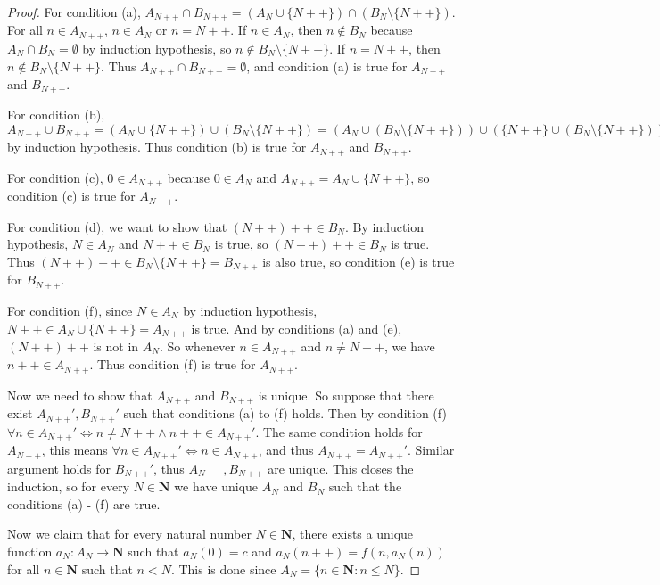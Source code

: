 \begin{proof}
    For condition (a), \(A_{N++} \cap B_{N++} = (A_N \cup \{N++\}) \cap (B_N \setminus \{N++\})\).
    For all \(n \in A_{N++}\), \(n \in A_N\) or \(n = N++\).
    If \(n \in A_N\), then \(n \notin B_N\) because \(A_N \cap B_N = \emptyset\) by induction hypothesis, so \(n \notin B_N \setminus \{N++\}\).
    If \(n = N++\), then \(n \notin B_N \setminus \{N++\}\).
    Thus \(A_{N++} \cap B_{N++} = \emptyset\), and condition (a) is true for \(A_{N++}\) and \(B_{N++}\).

    For condition (b), \(A_{N++} \cup B_{N++} = (A_N \cup \{N++\}) \cup (B_N \setminus \{N++\}) = (A_N \cup (B_N \setminus \{N++\})) \cup (\{N++\} \cup (B_N \setminus \{N++\})) = (A_N \cup (B_N \setminus \{N++\})) \cup B_N = A_N \cup B_N = \mathbf{N}\) by induction hypothesis.
    Thus condition (b) is true for \(A_{N++}\) and \(B_{N++}\).

    For condition (c), \(0 \in A_{N++}\) because \(0 \in A_N\) and \(A_{N++} = A_N \cup \{N++\}\), so condition (c) is true for \(A_{N++}\).

    For condition (d), we want to show that \((N++)++ \in B_N\).
    By induction hypothesis, \(N \in A_N\) and \(N++ \in B_N\) is true, so \((N++)++ \in B_N\) is true.
    Thus \((N++)++ \in B_N \setminus \{N++\} = B_{N++}\) is also true, so condition (e) is true for \(B_{N++}\).

    For condition (f), since \(N \in A_N\) by induction hypothesis, \(N++ \in A_N \cup \{N++\} = A_{N++}\) is true.
    And by conditions (a) and (e), \((N++)++\) is not in \(A_N\).
    So whenever \(n \in A_{N++}\) and \(n \neq N++\), we have \(n++ \in A_{N++}\).
    Thus condition (f) is true for \(A_{N++}\).

    Now we need to show that \(A_{N++}\) and \(B_{N++}\) is unique.
    So suppose that there exist \(A_{N++}', B_{N++}'\) such that conditions (a) to (f) holds.
    Then by condition (f) \(\forall n \in A_{N++}' \iff n \neq N++ \land n++ \in A_{N++}'\).
    The same condition holds for \(A_{N++}\), this means \(\forall n \in A_{N++}' \iff n \in A_{N++}\), and thus \(A_{N++} = A_{N++}'\).
    Similar argument holds for \(B_{N++}'\), thus \(A_{N++}, B_{N++}\) are unique.
    This closes the induction, so for every \(N \in \mathbf{N}\) we have unique \(A_N\) and \(B_N\) such that the conditions (a) - (f) are true.

    Now we claim that for every natural number \(N \in \mathbf{N}\), there exists a unique function \(a_N : A_N \to \mathbf{N}\) such that \(a_N(0) = c\) and \(a_N(n++) = f(n, a_{N}(n))\) for all \(n \in \mathbf{N}\) such that \(n < N\).
    This is done since \(A_N = \{n \in \mathbf{N} : n \leq N\}\).
\end{proof}

